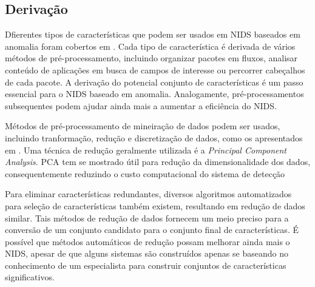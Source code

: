 \subsection{Derivação}
Dfierentes tipos de características que podem ser usados em NIDS baseados em anomalia foram cobertos em \cite{davis11}.
Cada tipo de característica é derivada de vários métodos de pré-processamento, incluindo organizar pacotes em fluxos,
analisar conteúdo de aplicações em busca de campos de interesse ou percorrer cabeçalhos de cada pacote. A derivação do
potencial conjunto de características é um passo essencial para o NIDS baseado em anomalia. Analogamente,
pré-processamentos subsequentes podem ajudar ainda mais a aumentar a eficiência do NIDS.
\par Métodos de pré-processamento de mineiração de dados podem ser usados, incluindo tranformação, redução e
discretização de dados, como os apresentados em \cite{ribeiro08}. Uma técnica de redução geralmente utilizada é a
\textit{Principal Component Analysis}. PCA tem se mostrado útil para redução da dimensionalidade dos dados,
consequentemente reduzindo o custo computacional do sistema de detecção
\par Para eliminar características redundantes, diversos algoritmos automatizados para seleção de características
também existem, resultando em redução de dados similar. Tais métodos de redução de dados fornecem um meio preciso para
a conversão de um conjunto candidato para o conjunto final de características. É possível que métodos automáticos de
redução possam melhorar ainda mais o NIDS, apesar de que alguns sistemas são construídos apenas se baseando no
conhecimento de um especialista para construir conjuntos de características significativos.

